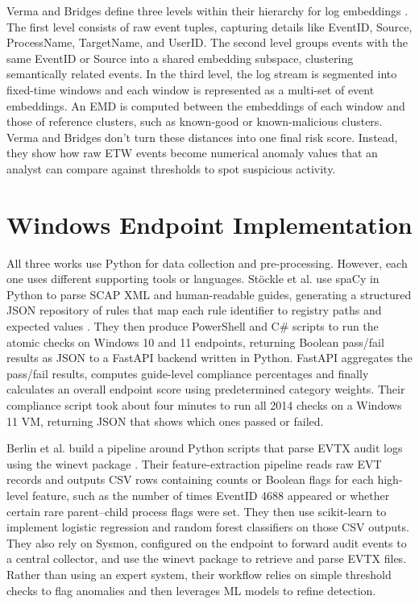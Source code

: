 \documentclass[conference, letterpaper]{IEEEtran}
\begin{document}
    Verma and Bridges define three levels within their hierarchy for log embeddings \cite{b3}. The first level consists of raw event tuples, capturing details like EventID, Source, ProcessName, TargetName, and UserID. The second level groups events with the same EventID or Source into a shared embedding subspace, clustering semantically related events. In the third level, the log stream is segmented into fixed-time windows and each window is represented as a multi-set of event embeddings. An EMD is computed between the embeddings of each window and those of reference clusters, such as known-good or known-malicious clusters. Verma and Bridges don't turn these distances into one final risk score. Instead, they show how raw ETW events become numerical anomaly values that an analyst can compare against thresholds to spot suspicious activity.

    \section{Windows Endpoint Implementation}
    All three works use Python for data collection and pre-processing. However, each one uses different supporting tools or languages. Stöckle et al. use spaCy in Python to parse SCAP XML and human-readable guides, generating a structured JSON repository of rules that map each rule identifier to registry paths and expected values \cite{b1}. They then produce PowerShell and C\# scripts to run the atomic checks on Windows 10 and 11 endpoints, returning Boolean pass/fail results as JSON to a FastAPI backend written in Python. FastAPI aggregates the pass/fail results, computes guide-level compliance percentages and finally calculates an overall endpoint score using predetermined category weights. Their compliance script took about four minutes to run all 2014 checks on a Windows 11 VM, returning JSON that shows which ones passed or failed.

    Berlin et al. build a pipeline around Python scripts that parse EVTX audit logs using the winevt package \cite{b2}. Their feature-extraction pipeline reads raw EVT records and outputs CSV rows containing counts or Boolean flags for each high-level feature, such as the number of times EventID 4688 appeared or whether certain rare parent–child process flags were set. They then use scikit-learn to implement logistic regression and random forest classifiers on those CSV outputs. They also rely on Sysmon, configured on the endpoint to forward audit events to a central collector, and use the winevt package to retrieve and parse EVTX files. Rather than using an expert system, their workflow relies on simple threshold checks to flag anomalies and then leverages ML models to refine detection.
\end{document}
